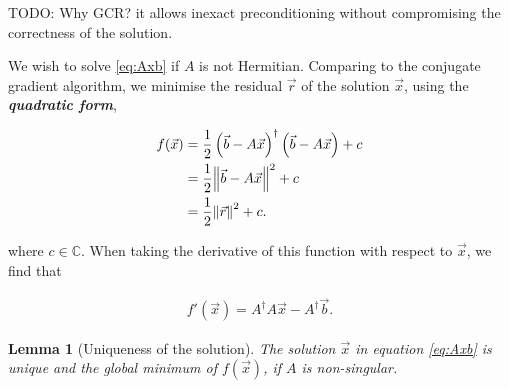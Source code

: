 \documentclass{article}
\theoremstyle{plain} %
\newtheorem{lemma}[theorem]{Lemma}
\theoremstyle{convention} %
\theoremstyle{remark} %
\def\df#1{\textbf{\textit{#1}}}
\numberwithin{equation}{section}
\begin{document}
TODO: Why GCR? it allows inexact preconditioning without compromising the correctness of the solution.

We wish to solve \eqref{eq:Axb} if $A$ is not Hermitian. Comparing to the conjugate gradient algorithm, we minimise the residual $\vec{r}$ of the solution $\vec{x}$, using the \df{quadratic form},

\begin{align*}
    f(\vec{x}) &= \frac{1}{2} \left( \vec{b} - A \vec{x} \right)^{\dagger} \left( \vec{b} - A \vec{x} \right) + c \\
               &= \frac{1}{2} \norm{ \vec{b} - A \vec{x} }^2 + c\\
               &= \frac{1}{2} \norm{ \vec{r} }^2 + c.
\end{align*}

where $c \in \mathbb{C}$. When taking the derivative of this function with respect to $\vec{x}$, we find that

\begin{align*}
    f'(\vec{x}) = A^{\dagger} A \vec{x} - A^{\dagger} \vec{b}.
\end{align*}

\begin{lemma}[Uniqueness of the solution]
The solution $\vec{x}$ in equation \eqref{eq:Axb} is unique and the global minimum of $f(\vec{x})$, if $A$ is non-singular.
\end{lemma}
\end{document}
